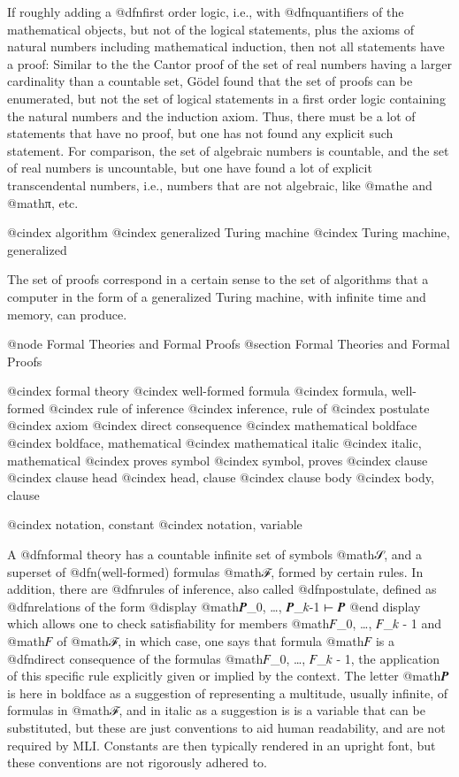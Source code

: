 If roughly adding a @dfn{first order logic}, i.e., with @dfn{quantifiers} of the mathematical objects, but not of the logical statements, plus the axioms of natural numbers including mathematical induction, then not all statements have a proof: Similar to the the Cantor proof of the set of real numbers having a larger cardinality than a countable set, Gödel found that the set of proofs can be enumerated, but not the set of logical statements in a first order logic containing the natural numbers and the induction axiom. Thus, there must be a lot of statements that have no proof, but one has not found any explicit such statement. For comparison, the set of algebraic numbers is countable, and the set of real numbers is uncountable, but one have found a lot of explicit transcendental numbers, i.e., numbers that are not algebraic, like @math{e} and @math{π}, etc.

@cindex algorithm
@cindex generalized Turing machine
@cindex Turing machine, generalized

The set of proofs correspond in a certain sense to the set of algorithms that a computer in the form of a generalized Turing machine, with infinite time and memory, can produce.


@node Formal Theories and Formal Proofs
@section Formal Theories and Formal Proofs

@cindex formal theory
@cindex well-formed formula
@cindex formula, well-formed
@cindex rule of inference
@cindex inference, rule of
@cindex postulate
@cindex axiom
@cindex direct consequence
@cindex mathematical boldface
@cindex boldface, mathematical
@cindex mathematical italic
@cindex italic, mathematical
@cindex proves symbol
@cindex symbol, proves
@cindex clause
@cindex clause head
@cindex head, clause
@cindex clause body
@cindex body, clause

@cindex notation, constant
@cindex notation, variable


A @dfn{formal theory} has a countable infinite set of symbols @math{𝒮}, and a superset of @dfn{(well-formed) formulas} @math{ℱ}, formed by certain rules. In addition, there are @dfn{rules of inference}, also called @dfn{postulate}, defined as @dfn{relations} of the form
@display
@math{𝑷_0, …, 𝑷_{𝑘-1} ⊢ 𝑷}
@end display
which allows one to check satisfiability for members @math{𝐹_0, …, 𝐹_{𝑘 - 1}} and @math{𝐹} of @math{ℱ}, in which case, one says that formula @math{𝐹} is a @dfn{direct consequence} of the formulas @math{𝐹_0, …, 𝐹_{𝑘 - 1}}, the application of this specific rule explicitly given or implied by the context. The letter @math{𝑷} is here in boldface as a suggestion of representing a multitude, usually infinite, of formulas in @math{ℱ}, and in italic as a suggestion is is a variable that can be substituted, but these are just conventions to aid human readability, and are not required by MLI. Constants are then typically rendered in an upright font, but these conventions are not rigorously adhered to.

